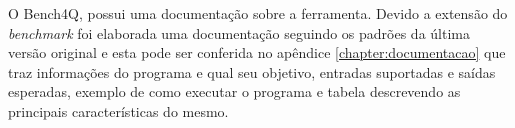 O Bench4Q, possui uma documentação sobre a ferramenta. Devido a extensão do \textit{benchmark} foi elaborada uma documentação seguindo os padrões da última versão original e esta pode ser conferida no apêndice \ref{chapter:documentacao} que traz informações do programa e qual seu objetivo, entradas suportadas e saídas esperadas, exemplo de como executar o programa e tabela descrevendo as principais características do mesmo.